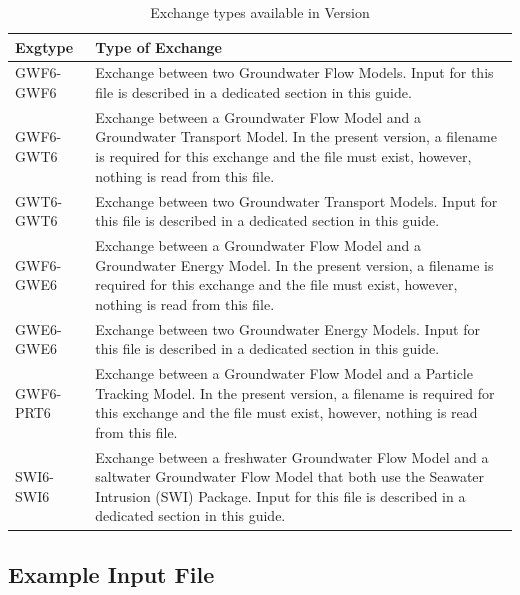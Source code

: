 \begin{table}[h]
\caption{Exchange types available in Version \modflowversion}
\small
\begin{center}
\begin{tabular*}{\columnwidth}{l p{13cm}}
\hline
\hline
Exgtype & Type of Exchange \\
\hline
GWF6-GWF6 & Exchange between two Groundwater Flow Models.  Input for this file is described in a dedicated section in this guide. \\
GWF6-GWT6 & Exchange between a Groundwater Flow Model and a Groundwater Transport Model.  In the present version, a filename is required for this exchange and the file must exist, however, nothing is read from this file.  \\
GWT6-GWT6 & Exchange between two Groundwater Transport Models.  Input for this file is described in a dedicated section in this guide. \\
GWF6-GWE6 & Exchange between a Groundwater Flow Model and a Groundwater Energy Model.  In the present version, a filename is required for this exchange and the file must exist, however, nothing is read from this file.  \\
GWE6-GWE6 & Exchange between two Groundwater Energy Models.  Input for this file is described in a dedicated section in this guide. \\
GWF6-PRT6 & Exchange between a Groundwater Flow Model and a Particle Tracking Model.  In the present version, a filename is required for this exchange and the file must exist, however, nothing is read from this file.  \\
SWI6-SWI6 & Exchange between a freshwater Groundwater Flow Model and a saltwater Groundwater Flow Model that both use the Seawater Intrusion (SWI) Package.  Input for this file is described in a dedicated section in this guide. \\
\hline
\end{tabular*}
\label{table:exgtype}
\end{center}
\normalsize
\end{table}

\vspace{5mm}
\subsection{Example Input File}



